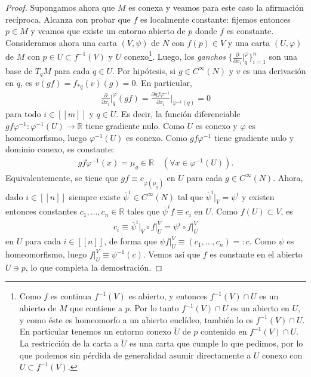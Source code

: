 \documentclass[11pt]{article}
\newcommand{\R}{\mathbb{R}}
\newcommand{\nat}[1]{[\![#1]\!]}
\newcommand{\ol}{\overline}
\newcommand{\hook}[3]{\frac{\partial}{\partial x_{#1}}\Big\rvert_{#2}^{#3}}
\begin{document}
\begin{proof}
Supongamos ahora que $M$ es conexa y veamos para este caso la afirmaci\'on rec\'iproca. Alcanza con probar que $f$ es localmente constante: fijemos entonces $p \in M$ y veamos que existe un entorno abierto de $p$ donde $f$ es constante. Consideramos ahora una carta $(V,\psi)$ de $N$ con $f(p) \in V$ y una carta $(U,\varphi)$ de $M$ con $p \in U \subset f^{-1}(V)$ y $U$ conexo\footnote{Como $f$ es continua $f^{-1}(V)$ es abierto, y entonces $f^{-1}(V) \cap U$ es un abierto de $M$ que contiene a $p$. Por lo tanto $f^{-1}(V) \cap U$ es un abierto en $U$, y como \'este es homeomorfo a un abierto eucl\'ideo, tambi\'en lo es $f^{-1}(V) \cap U$. En particular tenemos un entorno conexo $\tilde{U}$ de $p$ contenido en $f^{-1}(V) \cap U$. La restricci\'on de la carta a $\tilde{U}$ es una carta que cumple lo que pedimos, por lo que podemos sin p\'erdida de generalidad asumir directamente a $U$ conexo con $U \subset f^{-1}(V)$.}. Luego, los \textit{ganchos} $\bigg\{\hook{i}{q}{\varphi}\bigg\}_{i=1}^n$ son una base de $T_qM$ para cada $q \in U$. Por hip\'otesis, si $g \in C^\infty(N)$ y $v$ es una derivaci\'on en $q$, es $v(gf) = f_{\ast q}(v)(g) = 0$. En particular,
\begin{align*}
\hook{i}{q}{\varphi}(gf) = \frac{\partial gf\varphi^{-1}}{\partial x_i}\bigg\rvert_{\varphi^{-1}(q)} = 0
\end{align*}
para todo $i \in \nat{m}$ y $q \in U$. Es decir, la funci\'on diferenciable $gf\varphi^{-1} : \varphi^{-1}(U) \to \R$ tiene gradiente nulo. Como $U$ es conexo y $\varphi$ es homeomorfismo, luego $\varphi^{-1}(U)$ es conexo. Como $gf\varphi^{-1}$ tiene gradiente nulo y dominio conexo, es constante:
\begin{align*}
gf\varphi^{-1}(x) = \mu_{g} \in \R \quad (\forall x \in \varphi^{-1}(U)).
\end{align*}
Equivalentemente, se tiene que $gf \equiv c_{\varphi(\mu_g)}$ en $U$ para cada $g \in C^\infty(N)$. Ahora, dado $i \in \nat{n}$ siempre existe $\ol{\psi}^i \in C^\infty(N)$ tal que $\ol{\psi}^i|_V = \psi^i$ y existen entonces constantes $c_1, \dots, c_n \in \R$ tales que $\ol{\psi}^if \equiv c_i$ en $U$. Como $f(U) \subset V$, es
\begin{align*}
c_i \equiv \ol{\psi}^i|_V \circ f\Big|_U^V = \psi^i \circ f\Big|_U^V
\end{align*}
en $U$ para cada $i \in \nat{n}$, de forma que $\psi f \big|_U^V \equiv (c_1, \dots, c_n) =: c$. Como $\psi$ es homeomorfismo, luego $f \big|_U^V \equiv \psi^{-1}(c)$. Vemos as\'i que $f$ es constante en el abierto $U \ni p$, lo que completa la demostraci\'on.
\end{proof}
\end{document}
